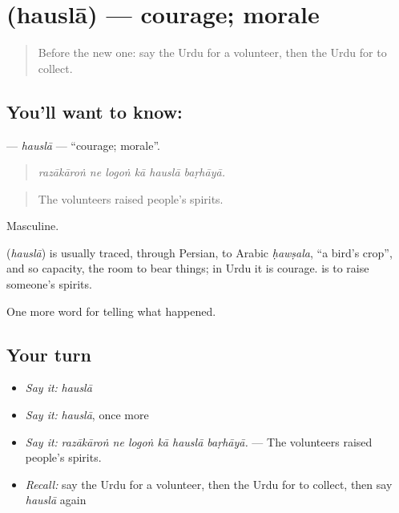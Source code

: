 \section[\texorpdfstring{\ur{حوصلہ} (hauslā)}{حوصلہ (hauslā)}]{ (hauslā) — courage; morale}

\label{lesson:UR-C299-hausla}



\begin{quote}
Before the new one: say the Urdu for a volunteer, then the Urdu for to collect.
\end{quote}

\subsection*{You'll want to know: }
\textbf{} — \emph{hauslā} — \textquotedblleft{}courage; morale\textquotedblright{}.

\begin{quote}
     
\end{quote}

\begin{quote}
\emph{razākāroṅ ne logoṅ kā hauslā baṛhāyā.}
\end{quote}

\begin{quote}
The volunteers raised people's spirits.
\end{quote}

Masculine.

\begin{cousinweb}
\textbf{} (\emph{hauslā}) is usually traced, through Persian, to Arabic \emph{ḥawṣala}, \textquotedblleft{}a bird's crop\textquotedblright{}, and so capacity, the room to bear things; in Urdu it is courage. \textbf{ } is to raise someone's spirits.
\end{cousinweb}

\begin{grammarlens}[title={What you've built}]
One more word for telling what happened.
\end{grammarlens}

\subsection*{Your turn}
\begin{itemize}
\raggedright
  \item \emph{Say it:} \emph{hauslā}
  \item \emph{Say it:} \emph{hauslā}, once more
  \item \emph{Say it:} \emph{razākāroṅ ne logoṅ kā hauslā baṛhāyā.} — The volunteers raised people's spirits.
  \item \emph{Recall:} say the Urdu for a volunteer, then the Urdu for to collect, then say \emph{hauslā} again
\end{itemize}

